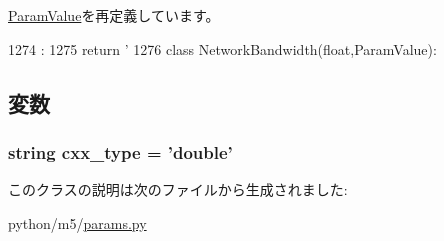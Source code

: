 \hyperlink{classm5_1_1params_1_1ParamValue_a33ebe6cd32bcbd15465fc28b9d94bf82}{ParamValue}を再定義しています。


\begin{DoxyCode}
1274                      :
1275         return '%
1276 
class NetworkBandwidth(float,ParamValue):
\end{DoxyCode}


\subsection{変数}
\hypertarget{classm5_1_1params_1_1Voltage_a2f1553ebb79374a68b36fdd6d8d82fc3}{
\subsubsection[{cxx\_\-type}]{\setlength{\rightskip}{0pt plus 5cm}string {\bf cxx\_\-type} = 'double'}}
\label{classm5_1_1params_1_1Voltage_a2f1553ebb79374a68b36fdd6d8d82fc3}


このクラスの説明は次のファイルから生成されました:\begin{DoxyCompactItemize}
\item 
python/m5/\hyperlink{params_8py}{params.py}\end{DoxyCompactItemize}
